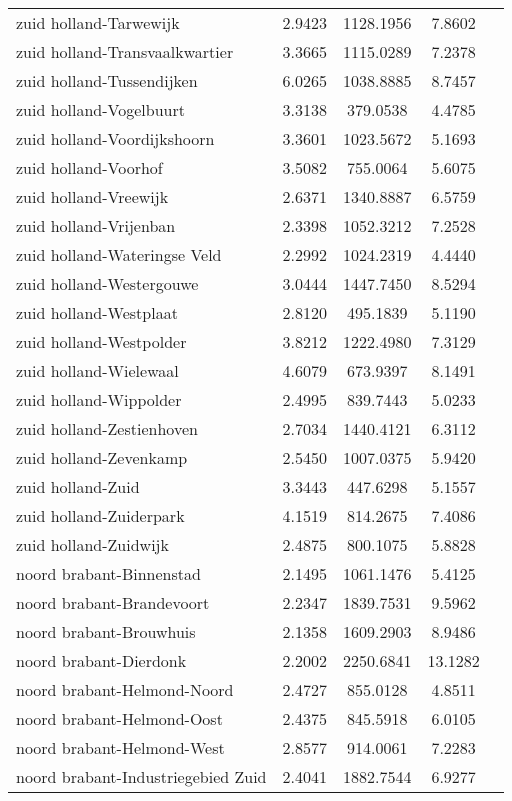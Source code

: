 \begin{longtable}{llccc}
zuid holland-Tarwewijk & 2.9423 & 1128.1956 & 7.8602 \\
zuid holland-Transvaalkwartier & 3.3665 & 1115.0289 & 7.2378 \\
zuid holland-Tussendijken & 6.0265 & 1038.8885 & 8.7457 \\
zuid holland-Vogelbuurt & 3.3138 & 379.0538 & 4.4785 \\
zuid holland-Voordijkshoorn & 3.3601 & 1023.5672 & 5.1693 \\
zuid holland-Voorhof & 3.5082 & 755.0064 & 5.6075 \\
zuid holland-Vreewijk & 2.6371 & 1340.8887 & 6.5759 \\
zuid holland-Vrijenban & 2.3398 & 1052.3212 & 7.2528 \\
zuid holland-Wateringse Veld & 2.2992 & 1024.2319 & 4.4440 \\
zuid holland-Westergouwe & 3.0444 & 1447.7450 & 8.5294 \\
zuid holland-Westplaat & 2.8120 & 495.1839 & 5.1190 \\
zuid holland-Westpolder & 3.8212 & 1222.4980 & 7.3129 \\
zuid holland-Wielewaal & 4.6079 & 673.9397 & 8.1491 \\
zuid holland-Wippolder & 2.4995 & 839.7443 & 5.0233 \\
zuid holland-Zestienhoven & 2.7034 & 1440.4121 & 6.3112 \\
zuid holland-Zevenkamp & 2.5450 & 1007.0375 & 5.9420 \\
zuid holland-Zuid & 3.3443 & 447.6298 & 5.1557 \\
zuid holland-Zuiderpark & 4.1519 & 814.2675 & 7.4086 \\
zuid holland-Zuidwijk & 2.4875 & 800.1075 & 5.8828 \\
noord brabant-Binnenstad & 2.1495 & 1061.1476 & 5.4125 \\
noord brabant-Brandevoort & 2.2347 & 1839.7531 & 9.5962 \\
noord brabant-Brouwhuis & 2.1358 & 1609.2903 & 8.9486 \\
noord brabant-Dierdonk & 2.2002 & 2250.6841 & 13.1282 \\
noord brabant-Helmond-Noord & 2.4727 & 855.0128 & 4.8511 \\
noord brabant-Helmond-Oost & 2.4375 & 845.5918 & 6.0105 \\
noord brabant-Helmond-West & 2.8577 & 914.0061 & 7.2283 \\
noord brabant-Industriegebied Zuid & 2.4041 & 1882.7544 & 6.9277 \\

\end{longtable}
